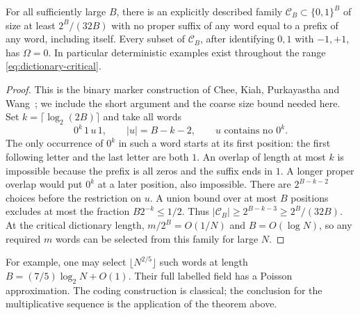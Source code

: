 \begin{corollary}
\label{cor:marker-dictionaries}
For all sufficiently large $B$, there is an explicitly described family
$\mathcal C_B\subset\{0,1\}^B$ of size at least $2^B/(32B)$ with no
proper suffix of any word equal to a prefix of any word, including itself.
Every subset of $\mathcal C_B$, after identifying $0,1$ with $-1,+1$,
has $\Omega=0$. In particular deterministic examples exist throughout
the range \eqref{eq:dictionary-critical}.
\end{corollary}
\begin{proof}
This is the binary marker construction of Chee, Kiah, Purkayastha and
Wang~\cite[Section III]{CheeKiahPurkayasthaWang2013}; we include the
short argument and the coarse size bound needed here.
Set $k=\lceil\log_2(2B)\rceil$ and take all words
\[
                0^k\,1\,u\,1,
       \qquad |u|=B-k-2,
       \qquad u\text{ contains no }0^k.
\]
The only occurrence of $0^k$ in such a word starts at its first position:
the first following letter and the last letter are both $1$.
An overlap of length at most $k$ is impossible because the prefix is all
zeros and the suffix ends in $1$. A longer proper overlap would put
$0^k$ at a later position, also impossible.
There are $2^{B-k-2}$ choices before the restriction on $u$. A union
bound over at most $B$ positions excludes at most the fraction
$B2^{-k}\le1/2$. Thus
$|\mathcal C_B|\ge2^{B-k-3}\ge2^B/(32B)$.
At the critical dictionary length, $m/2^B=O(1/N)$ and $B=O(\log N)$,
so any required $m$ words can be selected from this family for large $N$.
\end{proof}
For example, one may select $\lfloor N^{2/5}\rfloor$ such words at length
$B=(7/5)\log_2N+O(1)$. Their full labelled field has a Poisson
approximation. The coding construction is classical; the conclusion for
the multiplicative sequence is the application of the theorem above.

